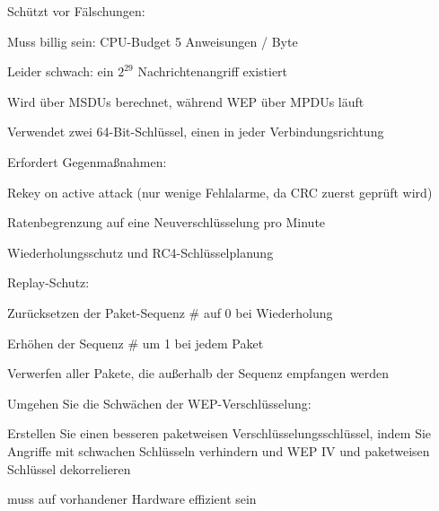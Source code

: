\documentclass[a4paper]{article}
\begin{document}
\begin{multicols}{3}
      \begin{itemize*}
            \item Schützt vor Fälschungen:
            \begin{itemize*}
                  \item Muss billig sein: CPU-Budget 5 Anweisungen / Byte
                  \item Leider schwach: ein $2^{29}$ Nachrichtenangriff existiert
                  \item Wird über MSDUs berechnet, während WEP über MPDUs läuft
                  \item Verwendet zwei 64-Bit-Schlüssel, einen in jeder Verbindungsrichtung
                  \item Erfordert Gegenmaßnahmen:
                  \begin{itemize*} \item Rekey on active attack (nur wenige Fehlalarme, da CRC zuerst geprüft wird) \item Ratenbegrenzung auf eine Neuverschlüsselung pro Minute \end{itemize*}
            \end{itemize*}
      \end{itemize*}

      Wiederholungsschutz und RC4-Schlüsselplanung

      \begin{itemize*}
            \item Replay-Schutz:
            \begin{itemize*}
                  \item Zurücksetzen der Paket-Sequenz \# auf 0 bei Wiederholung
                  \item Erhöhen der Sequenz \# um 1 bei jedem Paket
                  \item Verwerfen aller Pakete, die außerhalb der Sequenz empfangen werden
            \end{itemize*}
            \item Umgehen Sie die Schwächen der WEP-Verschlüsselung:
            \begin{itemize*}
                  \item Erstellen Sie einen besseren paketweisen Verschlüsselungsschlüssel, indem Sie Angriffe mit schwachen Schlüsseln verhindern und WEP IV und paketweisen Schlüssel dekorrelieren
                  \item muss auf vorhandener Hardware effizient sein
            \end{itemize*}
      \end{itemize*}


\end{multicols}
\end{document}
